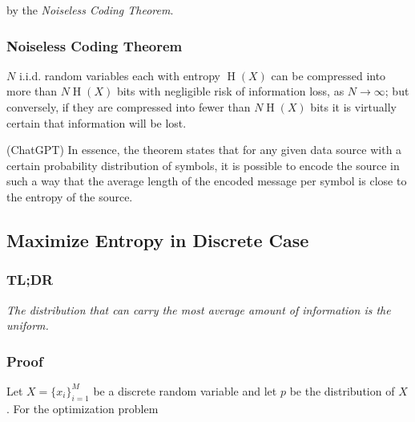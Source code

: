 \documentclass{article}
\begin{document}
                by the \textit{Noiseless Coding Theorem}.

            \subsubsection{Noiseless Coding Theorem}

                \begin{displayquote}
                     $ N $ i.i.d. random variables each with entropy $ \operatorname{H}(X) $
                     can be compressed into more than $ N \operatorname{H}(X) $ bits with
                     negligible risk of information loss, as $ N \rightarrow
                     \infty $; but conversely, if they are compressed into
                     fewer than $ N \operatorname{H}(X) $ bits it is virtually certain that
                     information will be lost.
                \end{displayquote}

                (ChatGPT) In essence, the theorem states that for any given
                data source with a certain probability distribution of symbols,
                it is possible to encode the source in such a way that the
                average length of the encoded message per symbol is close to
                the entropy of the source.

        \subsection{Maximize Entropy in Discrete Case}

            \subsubsection*{TL;DR}

                \begin{displayquote}
                    \textit{The distribution that can carry the most average
                    amount of information is the uniform.}
                \end{displayquote}

            \subsubsection*{Proof}
            
                Let $ X = \{x_i\}_{ i=1 }^M $ be a discrete random variable and let $ p $
                be the distribution of $ X $. For the optimization problem
\end{document}
